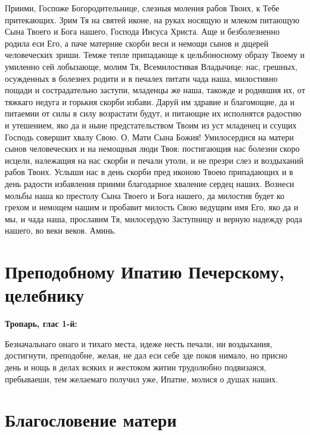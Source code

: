 Приими, Госпоже Богородительнице, слезныя моления рабов Твоих, к Тебе притекающих. Зрим Тя на святей иконе, на руках носящую и млеком питающую Сына Твоего и Бога нашего, Господа Иисуса Христа. Аще и безболезненно родила еси Его, а паче матерние скорби веси и немощи сынов и дщерей человеческих зриши. Темже тепле припадающе к цельбоносному образу Твоему и умиленно сей лобызающе, молим Тя, Всемилостивая Владычице: нас, грешных, осужденных в болезнех родити и в печалех питати чада наша, милостивно пощади и сострадательно заступи, младенцы же наша, такожде и родившия их, от тяжкаго недуга и горькия скорби избави. Даруй им здравие и благомощие, да и питаемии от силы в силу возрастати будут, и питающие их исполнятся радостию и утешением, яко да и ныне предстательством Твоим из уст младенец и ссущих Господь совершит хвалу Свою. О, Мати Сына Божия! Умилосердися на матери сынов человеческих и на немощныя люди Твоя: постигающия нас болезни скоро исцели, належащия на нас скорби и печали утоли, и не презри слез и воздыханий рабов Твоих. Услыши нас в день скорби пред иконою Твоею припадающих и в день радости избавления приими благодарное хваление сердец наших. Вознеси мольбы наша ко престолу Сына Твоего и Бога нашего, да милостив будет ко грехом и немощем нашим и пробавит милость Свою ведущим имя Его, яко да и мы, и чада наша, прославим Тя, милосердую Заступницу и верную надежду рода нашего, во веки веков. Аминь.

\section{Преподобному Ипатию Печерскому, целебнику}
 
\bfseries Тропарь, глас 1-й:\normalfont{}


Безначальнаго онаго и тихаго места, идеже несть печали, ни воздыхания, достигнути, преподобне, желая, не дал еси себе зде покоя нимало, но присно день и нощь в делах всяких и жестоком житии трудолюбно подвизаяся, пребываеши, тем желаемаго получил уже, Ипатие, молися о душах наших.

\bigskip\bigskip\mychapterending


 

\section{Благословение матери}
 


